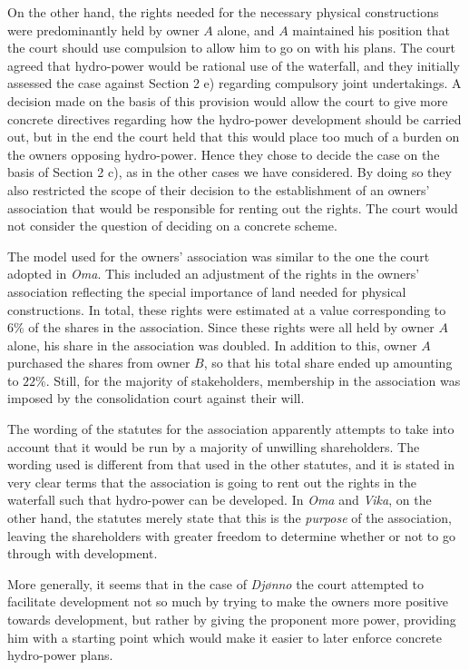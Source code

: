 On the other hand, the rights needed for the necessary physical constructions were predominantly held by owner $A$ alone, and $A$ maintained his position that the court should use compulsion to allow him to go on with his plans. The court agreed that hydro-power would be rational use of the waterfall, and they initially assessed the case against Section 2 e) regarding compulsory joint undertakings. A decision made on the basis of this provision would allow the court to give more concrete directives regarding how the hydro-power development should be carried out, but in the end the court held that this would place too much of a burden on the owners opposing hydro-power. Hence they chose to decide the case on the basis of Section 2 c), as in the other cases we have considered. By doing so they also restricted the scope of their decision to the establishment of an owners' association that would be responsible for renting out the rights. The court would not consider the question of deciding on a concrete scheme.

The model used for the owners' association was similar to the one the court adopted in \emph{Oma}. This included an adjustment of the rights in the owners' association reflecting the special importance of land needed for physical constructions. In total, these rights were estimated at a value corresponding to $6 \%$ of the shares in the association. Since these rights were all held by owner $A$ alone, his share in the association was doubled. In addition to this, owner $A$ purchased the shares from owner $B$, so that his total share ended up amounting to $22 \%$. Still, for the majority of stakeholders, membership in the association was imposed by the consolidation court against their will.

The wording of the statutes for the association apparently attempts to take into account that it would be run by a majority of unwilling shareholders. The wording used is different from that used in the other statutes, and it is stated in very clear terms that the association is going to rent out the rights in the waterfall such that hydro-power can be developed. In \emph{Oma} and \emph{Vika}, on the other hand, the statutes merely state that this is the \emph{purpose} of the association, leaving the shareholders with greater freedom to determine whether or not to go through with development.

More generally, it seems that in the case of \emph{Djønno} the court attempted to facilitate development not so much by trying to make the owners more positive towards development, but rather by giving the proponent more power, providing him with a starting point which would make it easier to later enforce concrete hydro-power plans.

